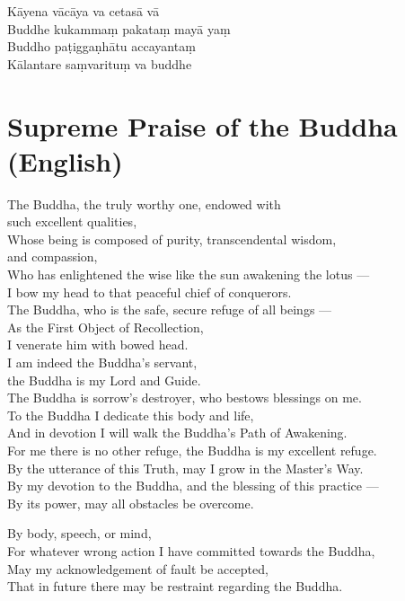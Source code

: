 
Kāyena vācāya va cetasā vā\\
Buddhe kukammaṃ pakataṃ mayā yaṃ\\
Buddho paṭiggaṇhātu accayantaṃ\\
Kālantare saṃvarituṃ va buddhe

\section*{Supreme Praise of the Buddha (English)}

\begin{leader}
\end{leader}

The Buddha, the truly worthy one, endowed with\\
\vin such excellent qualities,\\
Whose being is composed of purity, transcendental wisdom,\\
\vin and compassion,\\
Who has enlightened the wise like the sun awakening the lotus ---\\
I bow my head to that peaceful chief of conquerors.\\
The Buddha, who is the safe, secure refuge of all beings ---\\
As the First Object of Recollection,\\\vin I venerate him with bowed head.\\
I am indeed the Buddha's servant,\\\vin the Buddha is my Lord and Guide.\\
The Buddha is sorrow's destroyer, who bestows blessings on me.\\
To the Buddha I dedicate this body and life,\\
And in devotion I will walk the Buddha's Path of Awakening.\\
For me there is no other refuge, the Buddha is my excellent refuge.\\
By the utterance of this Truth, may I grow in the Master's Way.\\
By my devotion to the Buddha, and the blessing of this practice ---\\
By its power, may all obstacles be overcome.


By body, speech, or mind,\\
For whatever wrong action I have committed towards the Buddha,\\
May my acknowledgement of fault be accepted,\\
That in future there may be restraint regarding the Buddha.

